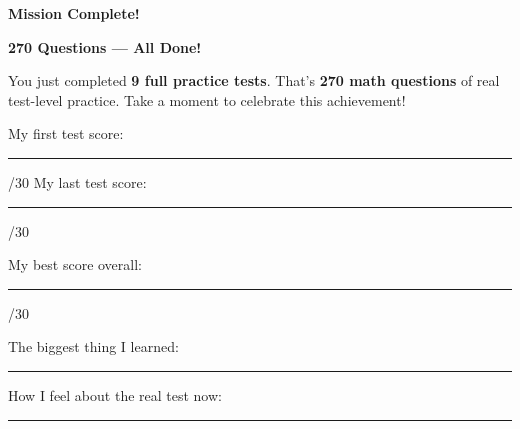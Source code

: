 \clearpage
\thispagestyle{empty}
{\sffamily

\begin{center}
{\fontsize{22}{26}\selectfont\bfseries\color{funBlue} \faTrophy\hspace{3mm}Mission Complete!\hspace{3mm}\faTrophy}

\vspace{2mm}
{\color{funGray}\hrulefill}
\end{center}

\vspace{3mm}

\begin{tcolorbox}[
    enhanced,
    colback=funBlueLight,
    colframe=funBlue!50,
    arc=10pt,
    boxrule=1.5pt,
    left=6mm, right=6mm, top=5mm, bottom=5mm,
]
{\large\bfseries\color{funBlueDark} \faMedal\hspace{2mm}270 Questions — All Done!}

\vspace{2mm}

You just completed \textbf{9 full practice tests}. That's \textbf{270 math questions} of real test-level practice. Take a moment to celebrate this achievement!

\vspace{3mm}

\faArrowRight\hspace{2mm}My first test score: \rule[-2pt]{1.2cm}{0.5pt}/30 \hfill My last test score: \rule[-2pt]{1.2cm}{0.5pt}/30

\vspace{2mm}

\faArrowRight\hspace{2mm}My best score overall: \rule[-2pt]{1.5cm}{0.5pt}/30

\vspace{2mm}

\faArrowRight\hspace{2mm}The biggest thing I learned: \rule[-2pt]{5cm}{0.5pt}

\vspace{2mm}

\faArrowRight\hspace{2mm}How I feel about the real test now: \rule[-2pt]{4.5cm}{0.5pt}
\end{tcolorbox}

\vspace{3mm}

}
